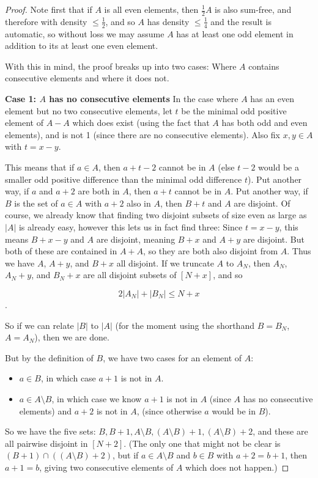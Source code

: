 \documentclass{report}
\theoremstyle{remark}
\numberwithin{equation}{section}
\begin{document}
\begin{proof}
Note first that if $A$ is all even elements, then $\frac12 A$ is
also sum-free, and therefore with density $\leq \frac12$, and so $A$
has density $\leq \frac14$ and the result is automatic, so without
loss we may assume $A$ has at least one odd element in addition to its
at least one even element.  

With this in mind, the proof breaks up into two cases: Where $A$
contains consecutive elements and where it does not.

\textbf{Case 1: $A$ has no consecutive elements} In the case where $A$
has an even element but no two consecutive elements, let $t$ be the
minimal odd positive element of $A-A$ which does exist (using the fact
that $A$ has both odd and even elements), and is not 1 (since there
are no consecutive elements).  Also fix $x, y \in A$ with $t = x-y$.

This means that if $a \in A$, then $a+t-2$ cannot be in $A$ (else
$t-2$ would be a smaller odd positive difference than the minimal odd
difference $t$).  Put another way, if $a$ and $a+2$ are both in $A$,
then $a+t$ cannot be in $A$.  Put another way, if $B$ is the set of
$a \in A$ with $a+2$ also in $A$, then $B+t$ and $A$ are disjoint.  Of
course, we already know that finding two disjoint subsets of size even
as large as $|A|$ is already easy, however this lets us in fact find
three: Since $t=x-y$, this means $B+x-y$ and $A$ are disjoint, meaning
$B+x$ and $A+y$ are disjoint.  But both of these are contained in
$A+A$, so they are both also disjoint from $A$.  Thus we have $A$,
$A+y$, and $B+x$ all disjoint.  If we truncate $A$ to $A_N$, then
$A_N$, $A_N + y$, and $B_N + x$ are all disjoint subsets of $[N+x]$,
and so

\[2|A_N|+|B_N| \leq N+x\].

So if we can relate $|B|$ to $|A|$ (for the moment using the shorthand
$B = B_N$, $A = A_N$), then we are done.  

But by the definition of $B$, we have two cases for an element of $A$: 
\begin{itemize}
\item $a \in B$, in which case $a+1$ is not in $A$.  
\item $a \in A\setminus B$, in which case we know $a+1$ is not in $A$
  (since $A$ has no consecutive elements) and $a+2$ is not in $A$,
  (since otherwise $a$ would be in $B$).
\end{itemize}

So we have the five sets:
$B, B+1, A\setminus B, (A\setminus B) + 1, (A\setminus B) + 2$, and
these are all pairwise disjoint in $[N+2]$.  (The only one that might
not be clear is $(B+1) \cap ((A \setminus B) + 2)$, but if
$a \in A\setminus B$ and $b \in B$ with $a+2=b+1$, then $a + 1 = b$,
giving two consecutive elements of $A$ which does not happen.)


\end{proof}
\end{document}
